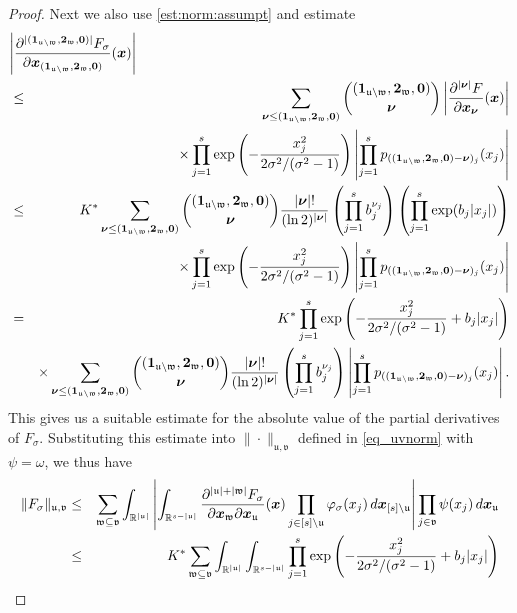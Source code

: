 \documentclass[10pt,a4paper]{amsart}
\newcommand{\bsnu}{\boldsymbol{\nu}}
\newcommand{\bsone}{\boldsymbol{1}}
\newcommand{\bstwo}{\boldsymbol{2}}
\newcommand{\bsx}{\boldsymbol{x}}
\newcommand{\bszero}{\boldsymbol{0}}
\newcommand{\rd}{\, {\rm d}}
\newcommand{\uu}{\mathfrak{u}}
\newcommand{\vv}{\mathfrak{v}}
\newcommand{\ww}{\mathfrak{w}}
\begin{document}
\begin{proof}
Next we also use \eqref{est:norm:assumpt} and estimate
\begin{eqnarray*}
\lefteqn{\left|\frac{\partial^{|(\bsone_{\uu \setminus \ww},\bstwo_{\ww},\bszero)|}F_{\sigma}}{\partial \bsx_{(\bsone_{\uu \setminus \ww},\bstwo_{\ww},\bszero)}} (\bsx)\right| }\\
& \le &  \sum_{\bsnu \le (\bsone_{\uu \setminus \ww},\bstwo_{\ww},\bszero)} {(\bsone_{\uu \setminus \ww},\bstwo_{\ww},\bszero) \choose \bsnu} \left|\frac{\partial^{|\bsnu|}F}{\partial \bsx_{\bsnu}}(\bsx)\right|  \\
& & \times \prod_{j = 1}^s \exp\left(-\frac{x_j^2}{2 \sigma^2/(\sigma^2-1)}\right) \left| \prod_{j=1}^s p_{((\bsone_{\uu \setminus \ww},\bstwo_{\ww},\bszero) -\bsnu)_j}(x_j)\right|\\
 & \le & K^{\ast} \sum_{\bsnu \le (\bsone_{\uu \setminus \ww},\bstwo_{\ww},\bszero)} {(\bsone_{\uu \setminus \ww},\bstwo_{\ww},\bszero) \choose \bsnu} \frac{|\bsnu|!}{(\ln 2)^{|\bsnu|}} \left(\prod_{j=1}^s b_j^{\nu_j}\right) \left(\prod_{j=1}^s \exp(b_j|x_j|)\right)\\
& & \times \prod_{j = 1}^s \exp\left(-\frac{x_j^2}{2 \sigma^2/(\sigma^2-1)}\right) \left| \prod_{j=1}^s p_{((\bsone_{\uu \setminus \ww},\bstwo_{\ww},\bszero) -\bsnu)_j}(x_j)\right|\\
 & = & K^{\ast} \prod_{j = 1}^s \exp\left(-\frac{x_j^2}{2 \sigma^2/(\sigma^2-1)} +b_j|x_j|\right) \\
 && \times \sum_{\bsnu \le (\bsone_{\uu \setminus \ww},\bstwo_{\ww},\bszero)} {(\bsone_{\uu \setminus \ww},\bstwo_{\ww},\bszero) \choose \bsnu} \frac{|\bsnu|!}{(\ln 2)^{|\bsnu|}} \left(\prod_{j=1}^s b_j^{\nu_j}\right)  \left| \prod_{j=1}^s p_{((\bsone_{\uu \setminus \ww},\bstwo_{\ww},\bszero) -\bsnu)_j}(x_j)\right|.
\end{eqnarray*}
This gives us a suitable estimate for the absolute value of the partial derivatives of $F_\sigma$. Substituting this estimate into $\|\cdot\|_{\uu, \vv}$ defined in \eqref{eq_uvnorm} with $\psi=\omega$, we thus have
\begin{eqnarray*}
\|F_{\sigma} \|_{\uu, \vv} & \le & \sum_{\ww \subseteq \vv} \int_{\mathbb{R}^{|\uu|}} \left| \int_{\mathbb{R}^{s-|\uu|}} \frac{\partial^{|\uu| + |\ww|} F_{\sigma}}{\partial \bsx_\ww \partial \bsx_{\uu}}(\bsx)\prod_{j \in [s]\setminus \uu} \varphi_{\sigma}(x_j) \rd \bsx_{[s] \setminus \uu} \right|   \prod_{j \in \vv} \psi(x_j)     \rd \bsx_{\uu}\\
& \le & K^{\ast} \sum_{\ww \subseteq \vv} \int_{\mathbb{R}^{|\uu|}}  \int_{\mathbb{R}^{s-|\uu|}} \prod_{j = 1}^s \exp\left(-\frac{x_j^2}{2 \sigma^2/(\sigma^2-1)} +b_j|x_j|\right)\\

\end{eqnarray*}
\end{proof}
\end{document}
